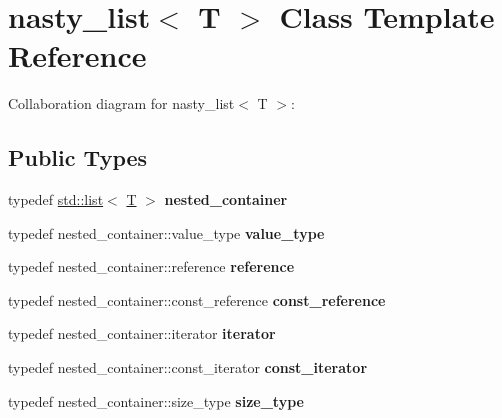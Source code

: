 \hypertarget{classnasty__list}{}\section{nasty\+\_\+list$<$ T $>$ Class Template Reference}
\label{classnasty__list}


Collaboration diagram for nasty\+\_\+list$<$ T $>$\+:
\subsection*{Public Types}
\begin{DoxyCompactItemize}
\item 
\mbox{\label{classnasty__list_ae4b5298f67601777f83b92fc968e1453}} 
typedef \mbox{\hyperlink{classstd_1_1list}{std\+::list}}$<$ \mbox{\hyperlink{struct_t}{T}} $>$ {\bfseries nested\+\_\+container}
\item 
\mbox{\label{classnasty__list_a4658376f8d447887d42303e684dbe850}} 
typedef nested\+\_\+container\+::value\+\_\+type {\bfseries value\+\_\+type}
\item 
\mbox{\label{classnasty__list_a874d6663ecd6808b320aa9e36bb90708}} 
typedef nested\+\_\+container\+::reference {\bfseries reference}
\item 
\mbox{\label{classnasty__list_abf5640a0a0961c10050665095a6761d0}} 
typedef nested\+\_\+container\+::const\+\_\+reference {\bfseries const\+\_\+reference}
\item 
\mbox{\label{classnasty__list_a82c02dcbf8352177b61cc57ba9fad99f}} 
typedef nested\+\_\+container\+::iterator {\bfseries iterator}
\item 
\mbox{\label{classnasty__list_a36b5189e60d0eb03550c7993d8701f64}} 
typedef nested\+\_\+container\+::const\+\_\+iterator {\bfseries const\+\_\+iterator}
\item 
\mbox{\label{classnasty__list_a08f9f75a3e946456bf65f4dcf8446c12}} 
typedef nested\+\_\+container\+::size\+\_\+type {\bfseries size\+\_\+type}
\item 
\mbox{\label{classnasty__list_a81fd75600c8adf5834c93682001ef9eb}} 

\end{DoxyCompactItemize}
